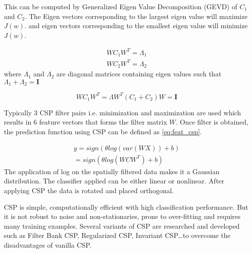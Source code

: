 This can be computed by Generalized Eigen Value Decomposition (GEVD) of $C_{1}$ and $C_{2}$. The Eigen vectors corresponding to the largest eigen value will maximize $J(w)$. and eigen vectors corresponding to the smallest eigen value will minimize $J(w)$. 

\begin{equation} \label{eq:def_csp}
    \begin{split}
        WC_{1}W^T = \Lambda_{1}\\
        WC_{2}W^T = \Lambda_{2}
    \end{split}
\end{equation}
where  $\Lambda_{1}$ and  $\Lambda_{2}$ are diagonal matrices containing eigen values such that $\Lambda_{1} + \Lambda_{2} = \mathbf{I}$

\begin{equation} \label{eq:def_gevd}
    WC_{1}W^T = \Lambda W^T(C_{1} + C_{2})W = \mathbf{I}
\end{equation}

Typically 3 CSP filter pairs i.e. minimization and maximization are used which results in 6 feature vectors that forms the filter matrix $W$. Once filter is obtained, the prediction function using CSP can be defined as \ref{eq:feat_csp}.

\begin{equation} \label{eq:feat_csp}
    \begin{split}
    y = sign(\theta log(var(WX)) +b) \\
        = sign(\theta log(WCW^T) + b)
    \end{split}
\end{equation}
The application of log on the spatially filtered data makes it a Gaussian distribution. The classifier applied can be either linear or nonlinear. After applying CSP the data is rotated and placed orthogonal.

CSP is simple, computationally efficient with high classification performance. But it is not robust to noise and non-stationaries, prone to over-fitting and requires many training examples. Several variants of CSP are researched and developed such as Filter Bank CSP, Regularized CSP, Invariant CSP\dots to overcome the disadvantages of vanilla CSP.


